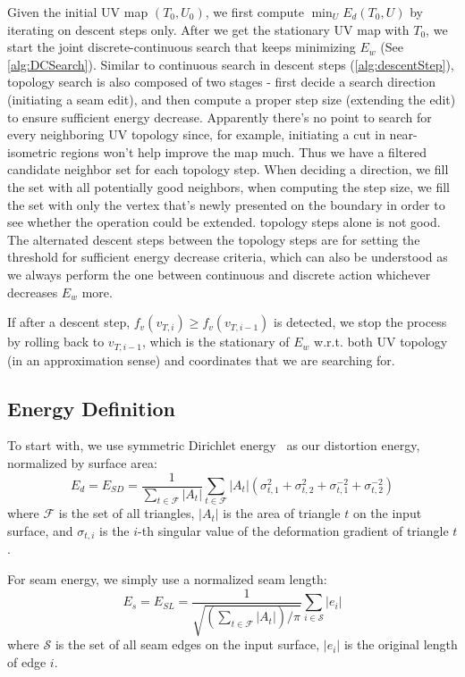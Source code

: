 Given the initial UV map $(T_0, U_0)$, we first compute $\min_U E_d(T_0,U)$ by iterating on descent steps only. After we get the stationary UV map with $T_0$, we start the joint discrete-continuous search that keeps minimizing $E_w$ (See \autoref{alg:DCSearch}). Similar to continuous search in descent steps (\autoref{alg:descentStep}), topology search is also composed of two stages - first decide a search direction (initiating a seam edit), and then compute a proper step size (extending the edit) to ensure sufficient energy decrease. Apparently there's no point to search for every neighboring UV topology since, for example, initiating a cut in near-isometric regions won't help improve the map much. Thus we have a filtered candidate neighbor set for each topology step. When deciding a direction, we fill the set with all potentially good neighbors, when computing the step size, we fill the set with only the vertex that's newly presented on the boundary in order to see whether the operation could be extended.
topology steps alone is not good. The alternated descent steps between the topology steps are for setting the threshold for sufficient energy decrease criteria, which can also be understood as we always perform the one between continuous and discrete action whichever decreases $E_w$ more.

If after a descent step, $f_v(v_{T,i}) \geq f_v(v_{T,i-1})$ is detected, we stop the process by rolling back to $v_{T,i-1}$, which is the stationary of $E_w$ w.r.t. both UV topology (in an approximation sense) and coordinates that we are searching for.

\subsection{Energy Definition}

To start with, we use symmetric Dirichlet energy~\cite{Smith2015Bijective} as our distortion energy, normalized by surface area:
\[ E_d = E_{SD} = \frac{1}{\sum_{t\in\mathcal{F}} |A_t|} \sum_{t\in\mathcal{F}} |A_t|(\sigma_{t,1}^2 + \sigma_{t,2}^2 + \sigma_{t,1}^{-2} + \sigma_{t,2}^{-2}) \]
where $\mathcal{F}$ is the set of all triangles, $|A_t|$ is the area of triangle $t$ on the input surface, and $\sigma_{t,i}$ is the $i$-th singular value of the deformation gradient of triangle $t$.

For seam energy, we simply use a normalized seam length:
\[ E_s = E_{SL} = \frac{1}{\sqrt{(\sum_{t\in\mathcal{F}} |A_t|)/\pi}} \sum_{i \in \mathcal{S}} |e_i| \]
where $\mathcal{S}$ is the set of all seam edges on the input surface, $|e_i|$ is the original length of edge $i$.

